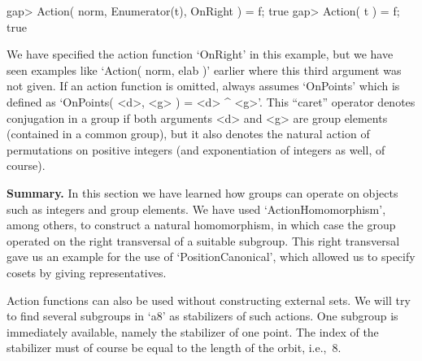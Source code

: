 \beginexample
gap> Action( norm, Enumerator(t), OnRight ) = f;
true
gap> Action( t ) = f;
true
\endexample

We  have specified the action function  `OnRight' in this example, but
we have seen  examples like `Action( norm,  elab )' earlier where this
third argument was not given. If an action function is omitted, {\GAP}
always assumes `OnPoints' which is defined as `OnPoints( <d>, <g> ) = <d>
^ <g>'. This ``caret''  operator denotes conjugation in  a group if  both
arguments <d> and  <g> are group elements  (contained in a common group),
but it also  denotes the natural  action  of permutations on  positive
integers (and exponentiation of integers as well, of course).

%

%  

{\bf Summary.} In this section we have learned  how groups can operate on
{\GAP}   objects such as  integers  and   group  elements.  We  have used
`ActionHomomorphism',    among   others,   to   construct   a  natural
homomorphism,  in which case the  group operated on the right transversal
of a suitable subgroup. This right transversal gave us an example for the
use of `PositionCanonical', which allowed  us to specify cosets by giving
representatives.


Action functions can also be  used without constructing external sets.
We will try to   find several subgroups  in `a8'  as stabilizers of  such
actions. One subgroup is immediately  available, namely the stabilizer
of one point. The index of the stabilizer must of course  be equal to the
length of the orbit, i.e.,~8.

